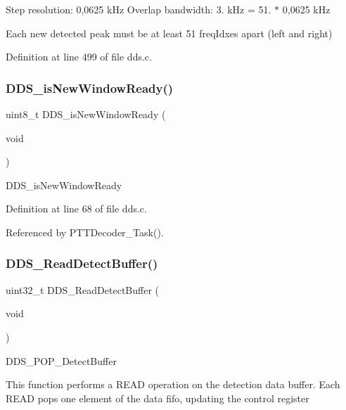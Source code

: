 Step resolution\+: 0,0625 k\+Hz Overlap bandwidth\+: 3. k\+Hz = 51. $\ast$ 0,0625 k\+Hz

Each new detected peak must be at least 51 freq\+Idxes apart (left and right)

Definition at line 499 of file dds.\+c.

\mbox{\label{group___d_d_s_ga449b3850974b9054a63359b104b440dc}} 
\subsubsection{\texorpdfstring{D\+D\+S\+\_\+is\+New\+Window\+Ready()}{DDS\_isNewWindowReady()}}
{\footnotesize\ttfamily uint8\+\_\+t D\+D\+S\+\_\+is\+New\+Window\+Ready (\begin{DoxyParamCaption}\item[{void}]{ }\end{DoxyParamCaption})}

D\+D\+S\+\_\+is\+New\+Window\+Ready 

Definition at line 68 of file dds.\+c.



Referenced by P\+T\+T\+Decoder\+\_\+\+Task().

\mbox{\label{group___d_d_s_gabfb67b0cb69b7d443df5a21426422bbf}} 
\subsubsection{\texorpdfstring{D\+D\+S\+\_\+\+Read\+Detect\+Buffer()}{DDS\_ReadDetectBuffer()}}
{\footnotesize\ttfamily uint32\+\_\+t D\+D\+S\+\_\+\+Read\+Detect\+Buffer (\begin{DoxyParamCaption}\item[{void}]{ }\end{DoxyParamCaption})}

D\+D\+S\+\_\+\+P\+O\+P\+\_\+\+Detect\+Buffer

This function performs a R\+E\+AD operation on the detection data buffer. Each R\+E\+AD pops one element of the data fifo, updating the control register 

